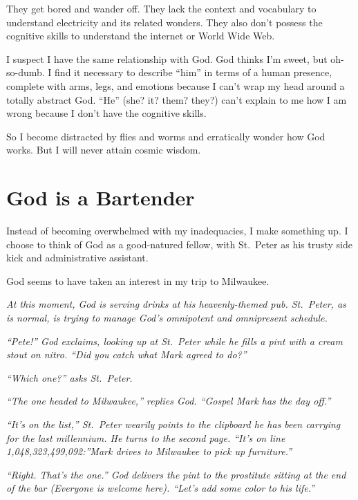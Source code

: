 \documentclass[
  letterpaper,
  DIV=11,
  numbers=noendperiod]{scrreprt}
\begin{document}
They get bored and wander off. They lack the context and vocabulary to
understand electricity and its related wonders. They also don't possess
the cognitive skills to understand the internet or World Wide Web.

I suspect I have the same relationship with God. God thinks I'm sweet,
but oh-so-dumb. I find it necessary to describe ``him'' in terms of a
human presence, complete with arms, legs, and emotions because I can't
wrap my head around a totally abstract God. ``He'' (she? it? them?
they?) can't explain to me how I am wrong because I don't have the
cognitive skills.

So I become distracted by flies and worms and erratically wonder how God
works. But I will never attain cosmic wisdom.

\section*{God is a Bartender}\label{god-is-a-bartender}


Instead of becoming overwhelmed with my inadequacies, I make something
up. I choose to think of God as a good-natured fellow, with St.~Peter as
his trusty side kick and administrative assistant.

God seems to have taken an interest in my trip to Milwaukee.

\emph{At this moment, God is serving drinks at his heavenly-themed pub.
St.~Peter, as is normal, is trying to manage God's omnipotent and
omnipresent schedule.}

\emph{``Pete!'' God exclaims, looking up at St.~Peter while he fills a
pint with a cream stout on nitro. ``Did you catch what Mark agreed to
do?''}

\emph{``Which one?'' asks St.~Peter.}

\emph{``The one headed to Milwaukee,'' replies God. ``Gospel Mark has
the day off.''}

\emph{``It's on the list,'' St.~Peter wearily points to the clipboard he
has been carrying for the last millennium. He turns to the second page.
``It's on line 1,048,323,499,092:''Mark drives to Milwaukee to pick up
furniture.''}

\emph{``Right. That's the one.'' God delivers the pint to the prostitute
sitting at the end of the bar (Everyone is welcome here). ``Let's add
some color to his life.''}
\end{document}
